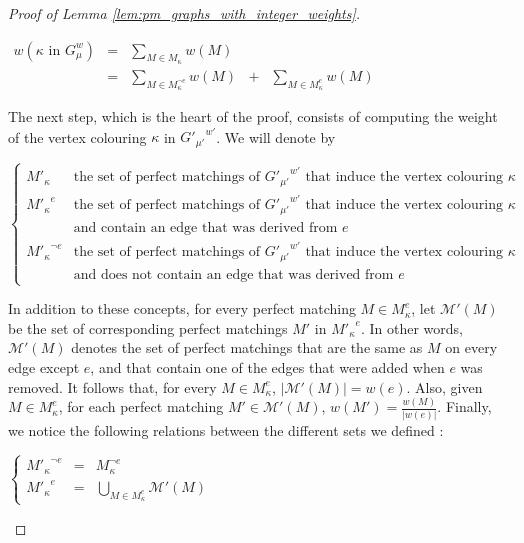 \begin{proof}[Proof of Lemma \ref{lem:pm_graphs_with_integer_weights}]
    \begin{center}
        $\begin{array}{lclcl}
            w(\kappa \mbox{ in } G_\mu^w)
                & = & \sum\limits_{M \in M_{\kappa}} w(M) \\
                & = & \sum\limits_{M \in M_{\kappa}^{\neg e}} w(M) & + & \sum\limits_{M \in M_{\kappa}^{e}} w(M)
        \end{array}$
    \end{center}

    The next step, which is the heart of the proof, consists of computing the weight of the vertex colouring $\kappa$ in ${G'_{\mu'}}^{w'}$.
    We will denote by

    \begin{center}
        $\left\{
            \begin{array}{ll}
                M'_{\kappa}            & \mbox{the set of perfect matchings of } {G'_{\mu'}}^{w'} \mbox{ that induce the vertex colouring } \kappa \\
                {M'_{\kappa}}^e        & \mbox{the set of perfect matchings of } {G'_{\mu'}}^{w'} \mbox{ that induce the vertex colouring } \kappa \\
                                   & \mbox{and contain an edge that was derived from } e \\
                {M'_{\kappa}}^{\neg e} & \mbox{the set of perfect matchings of } {G'_{\mu'}}^{w'} \mbox{ that induce the vertex colouring } \kappa \\
                                   & \mbox{and does not contain an edge that was derived from } e
            \end{array}
        \right.$
    \end{center}

    In addition to these concepts, for every perfect matching $M \in M_{\kappa}^e$, let $\mathcal{M}'(M)$ be the set of corresponding perfect matchings $M'$ in ${M'_{\kappa}}^e$.
    In other words, $\mathcal{M}'(M)$ denotes the set of perfect matchings that are the same as $M$ on every edge except $e$, and that contain one of the edges that were added when $e$ was removed.
    It follows that, for every $M \in M_{\kappa}^e$, $|\mathcal{M}'(M)| = w(e)$.
    Also, given $M \in M_{\kappa}^e$, for each perfect matching $M' \in \mathcal{M}'(M)$, $w(M') = \frac{w(M)}{|w(e)|}$.
    Finally, we notice the following relations between the different sets we defined :

    \begin{center}
        $\left\{
            \begin{array}{lcl}
                {M'_{\kappa}}^{\neg e} & = & M_{\kappa}^{\neg e} \\
                {M'_{\kappa}}^e        & = & \bigcup\limits_{M \in M_{\kappa}^e} \mathcal{M}'(M)
            \end{array}
        \right.$
    \end{center}


\end{proof}

